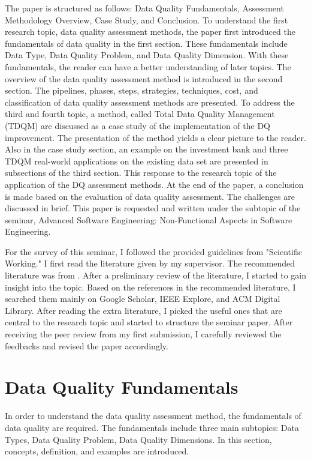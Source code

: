 \documentclass[pdftex,english,oribibl]{llncs}
\begin{document}
The paper is structured as follows: Data Quality Fundamentals, Assessment Methodology Overview,  Case Study, and Conclusion.
To understand the first research topic, data quality assessment methods, the paper first introduced the fundamentals of data quality in the first section. These fundamentals include Data Type, Data Quality Problem, and Data Quality Dimension. With these fundamentals, the reader can have a better understanding of later topics. The overview of the data quality assessment method is introduced in the second section. The pipelines, phases, steps, strategies, techniques, cost, and classification of data quality assessment methods are presented. To address the third and fourth topic,
a method, called Total Data Quality Management (TDQM) are discussed as a case study of the implementation of the DQ improvement.\cite{Wang1998TDQM} The presentation of the method yields a clear picture to the reader. Also in the case study section,  an example on the investment bank and three TDQM real-world applications on the existing data set are presented in subsections of the third section. This response to the research topic of the application of the DQ assessment methods.
At the end of the paper, a conclusion is made based on the evaluation of data quality assessment.  The challenges are discussed in brief. This paper is requested and written under the subtopic of the seminar, Advanced Software Engineering: Non-Functional Aspects in Software Engineering.

For the survey of this seminar, I followed the provided guidelines from "Scientific Working." I first read the literature given by my supervisor.
The recommended literature was from  \citet{Pipino2002DataQualityAssessment, Batini2009MethodologiesForDataQuality, Cai2005ChallnegesOfDataQuality}. After a preliminary review of the literature, I started to gain insight into the topic. Based on the references in the recommended literature, I searched them mainly on Google Scholar, IEEE Explore, and ACM Digital Library.
After reading the extra literature, I picked the useful ones that are central to the research topic and started to structure the seminar paper.  After receiving the peer review from my first submission, I carefully reviewed the feedbacks and revised the paper accordingly.

\section{Data Quality Fundamentals}
In order to understand the data quality assessment method, the fundamentals of data quality are required. The fundamentals include three main subtopics: Data Types, Data Quality Problem, Data Quality Dimensions.  In this section, concepts, definition, and examples are
introduced.
\end{document}
